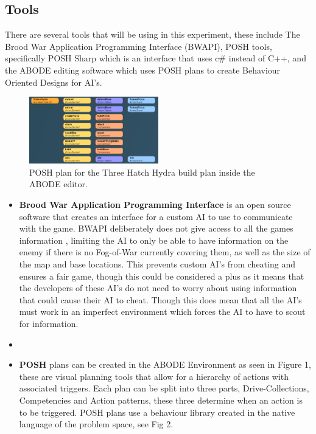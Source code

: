 \documentclass[journal]{IEEEtran}
\begin{document}
\subsection{Tools}
There are several tools that will be using in this experiment, these include The Brood War Application Programming Interface (BWAPI), POSH tools, specifically POSH Sharp which is an interface that uses c\# instead of C++, and the ABODE editing software which uses POSH plans to create Behaviour Oriented Designs for AI's. 

\begin{figure}
\centering
\includegraphics[width=0.5\textwidth]{POSH}
\caption{POSH plan for the Three Hatch Hydra build plan inside the ABODE editor.}
\label{Fig1}
\end{figure}
\begin{itemize}
\item \textbf{Brood War Application Programming Interface} \cite{BWAPI} is an open source software that creates an interface for a custom AI to use to communicate with the game. BWAPI deliberately does not give access to all the games information \cite{POSH}, limiting the AI to only be able to have information on the enemy if there is no Fog-of-War currently covering them, as well as the size of the map and base locations. This prevents custom AI's from cheating and ensures a fair game, though this could be considered a plus as it means that the developers of these AI's do not need to worry about using information that could cause their AI to cheat. Though this does mean that all the AI's must work in an imperfect environment which forces the AI to have to scout for information.
\item[]
\item \textbf{POSH} plans can be created in the ABODE Environment as seen in Figure 1, these are visual planning tools that allow for a hierarchy of actions with associated triggers. Each plan can be split into three parts, Drive-Collections, Competencies and Action patterns, these three determine when an action is to be triggered. POSH plans use a behaviour library created in the native language of the problem space, see Fig 2. 
\end{itemize}
\end{document}
